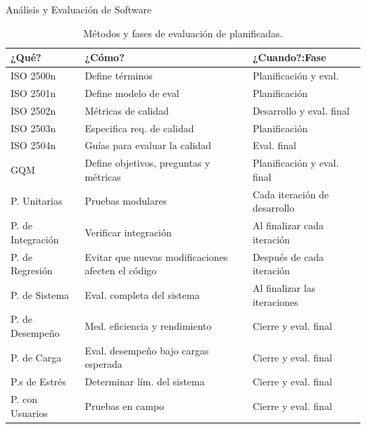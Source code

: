 \documentclass[spanish]{beamer} %
\begin{document}
\begin{frame}{Análisis y Evaluación de Software}
  \begin{table}[ht]
  \caption{Métodos y fases de evaluación de planificadas.}
  \label{tab:evaluacion_software}
  \centering
  \scriptsize
  \begin{tabularx}{\textwidth}{|l|X|X|}
  \hline
  \textbf{¿Qué?} & \textbf{¿Cómo?} & \textbf{¿Cuando?:Fase} \\
  \hline
  ISO 2500n & Define términos & Planificación y eval. \\
  \hline
  ISO 2501n & Define modelo de eval & Planificación \\
  \hline
  ISO 2502n & Métricas de calidad & Desarrollo y eval. final \\
  \hline
  ISO 2503n & Especifica req. de calidad & Planificación \\
  \hline
  ISO 2504n & Guías para evaluar la calidad & Eval. final \\
  \hline
  GQM & Define objetivos, preguntas y métricas & Planificación y eval. final \\
  \hline
  P. Unitarias & Pruebas modulares & Cada iteración de desarrollo \\
  \hline
  P. de Integración & Verificar integración & Al finalizar cada iteración \\
  \hline
  P. de Regresión & Evitar que nuevas modificaciones afecten el código & Después de cada iteración \\
  \hline
  P. de Sistema & Eval. completa del sistema & Al finalizar las iteraciones \\
  \hline
  P. de Desempeño & Med. eficiencia y rendimiento & Cierre y eval. final \\
  \hline
  P. de Carga & Eval. desempeño bajo cargas esperada & Cierre y eval. final \\
  \hline
  P.s de Estrés & Determinar lím. del sistema & Cierre y eval. final \\
  \hline
  P. con Usuarios & Pruebas en campo & Cierre y eval. final \\
  \hline
  \end{tabularx}
\end{table} 
\end{frame}
\end{document}
